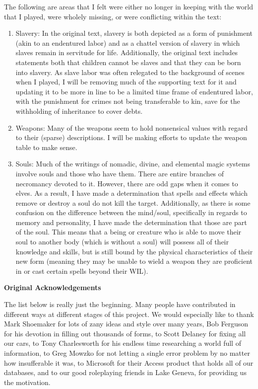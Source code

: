 The following are areas that I felt were either no longer in keeping with the world that I played, were wholely missing, or were conflicting within the text:
\begin{enumerate}
\item Slavery: In the original text, slavery is both depicted as a form of punishment (akin to an endentured labor) and as a chattel version of slavery in which slaves remain in servitude for life. Additionally, the original text includes statements both that children cannot be slaves and that they can be born into slavery. As slave labor was often relegated to the background of scenes when I played, I will be removing much of the supporting text for it and updating it to be more in line to be a limited time frame of endentured labor, with the punishment for crimes not being transferable to kin, save for the withholding of inheritance to cover debts.
\item Weapons: Many of the weapons seem to hold nonsensical values with regard to their (sparse) descriptions. I will be making efforts to update the weapon table to make sense.
\item Souls: Much of the writings of nomadic, divine, and elemental magic systems involve souls and those who have them. There are entire branches of necromancy devoted to it. However, there are odd gaps when it comes to elves. As a result, I have made a determination that spells and effects which remove or destroy a soul do not kill the target. Additionally, as there is some confusion on the difference between the mind/soul, specifically in regards to memory and personality, I have made the determination that those are part of the soul. This means that a being or creature who is able to move their soul to another body (which is without a soul) will possess all of their knowledge and skills, but is still bound by the physical characteristics of their new form (meaning they may be unable to wield a weapon they are proficient in or cast certain spells beyond their WIL).
\end{enumerate}

\textbf{Original Acknowledgements}

The list below is really just the beginning. Many people have contributed in different ways at different stages of this project. We would especially like to thank Mark Shoemaker for lots of zany ideas and style over many years, Bob Ferguson for his devotion in filling out thousands of forms, to Scott Delaney for fixing all our cars, to Tony Charlesworth for his endless time researching a world full of information, to Greg Mowzko for not letting a single error problem by no matter how insufferable it was, to Microsoft for their Access product that holds all of our databases, and to our good roleplaying friends in Lake Geneva, for providing us the motivation.

